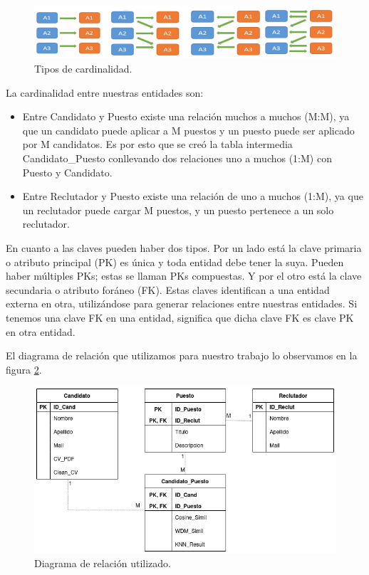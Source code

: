 \documentclass[12pt,a4paper]{article}
\begin{document}
\begin{sloppypar}
\begin{figure}[H]    %
  \centering
  \includegraphics[width=1\textwidth]{images/Cardinalidad.png}
  \caption{Tipos de cardinalidad.}  
  \label{fig:Cardinalidad}
\end{figure}

La cardinalidad entre nuestras entidades son:
\begin{itemize}
\item Entre Candidato y Puesto existe una relación muchos a muchos (M:M), ya que un candidato puede aplicar a M puestos y un puesto puede ser aplicado por M candidatos. Es por esto que se creó la tabla intermedia Candidato\_Puesto conllevando dos relaciones uno a muchos (1:M) con Puesto y Candidato.
\item Entre Reclutador y Puesto existe una relación de uno a muchos (1:M), ya que un reclutador puede cargar M puestos, y un puesto pertenece a un solo reclutador.
\end{itemize}

En cuanto a las claves pueden haber dos tipos. Por un lado está la clave primaria o atributo principal (PK)  es única y toda entidad debe tener la suya. Pueden haber múltiples PKs; estas se llaman PKs compuestas. Y por el otro está la clave secundaria o atributo foráneo (FK). Estas claves identifican a una entidad externa en otra, utilizándose para generar relaciones entre nuestras entidades. Si tenemos una clave FK en una entidad, significa que dicha clave FK es clave PK en otra entidad.


El diagrama de relación que utilizamos para nuestro trabajo lo observamos en la figura \ref{fig:Entity_Relation}.

\begin{figure}[H]    %
  \centering
  \includegraphics[width=1\textwidth]{images/BD_Entity_Relation.png}
  \caption{Diagrama de relación utilizado.}  
  \label{fig:Entity_Relation}
\end{figure}


\end{sloppypar}
\end{document}
